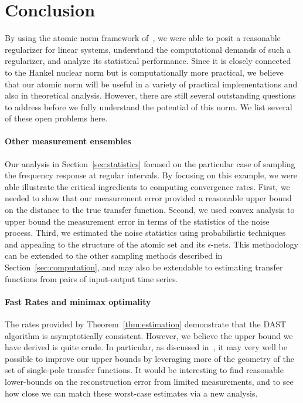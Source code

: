\section{Conclusion}\label{sec:conclusion}

By using the atomic norm framework of~\cite{CRPW10}, we were able to posit a reasonable regularizer for linear systems, understand the computational demands of such a regularizer, and analyze its statistical performance.  Since it is closely connected to the Hankel nuclear norm but is computationally more practical, we believe that our atomic norm will be useful in a variety of practical implementations and also in theoretical analysis.  However, there are still several outstanding questions to address before we fully understand the potential of this norm.  We list several of these open problems here.

\paragraph{Other measurement ensembles} Our analysis in Section~\ref{sec:statistics} focused on the particular case of sampling the frequency response at regular intervals.  By focusing on this example, we were able illustrate the critical ingredients to computing convergence rates.  First, we needed to show that our measurement error provided a reasonable upper bound on the distance to the true transfer function.  Second, we used convex analysis to upper bound the measurement error in terms of the statistics of the noise process.  Third, we estimated the noise statistics using probabilistic techniques and appealing to the structure of the atomic set and its $\epsilon$-nets.  This methodology can be extended to the other sampling methods described in Section~\ref{sec:computation}, and may also be extendable to estimating transfer functions from pairs of input-output time series.

\paragraph{Fast Rates and minimax optimality}  The rates provided by Theorem~\ref{thm:estimation} demonstrate that the DAST algorithm is asymptotically consistent.  However, we believe the upper bound we have derived is quite crude.  In particular, as discussed in~\cite{BhaskarAllerton11}, it may very well be possible to improve our upper bounds by leveraging more of the geometry of the set of single-pole transfer functions.  It would be interesting to find reasonable lower-bounds on the reconstruction error from limited measurements, and to see how close we can match these worst-case estimates via a new analysis.

